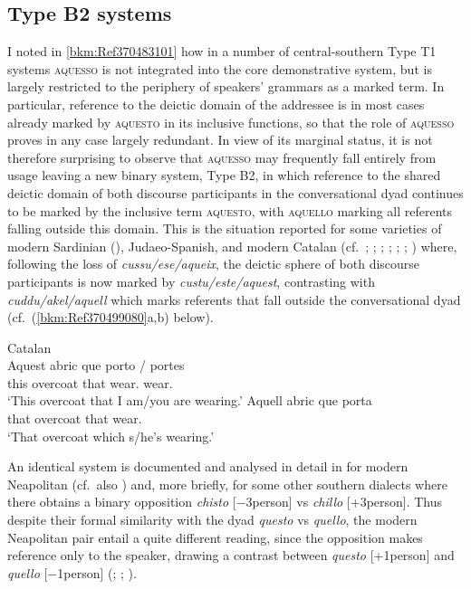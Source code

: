 \documentclass[output=paper]{langsci/langscibook}
\begin{document}
\subsection{Type B2 systems}\label{bkm:Ref370495450}

I noted in \cref{bkm:Ref370483101} how in a number of central-southern 
Type T1 systems \textsc{aques\-so} is not integrated into the core demonstrative
system, but is largely restricted to the periphery of speakers’ grammars as a
marked term. In particular, reference to the deictic domain of the addressee is
in most cases already marked by \textsc{aquesto} in its inclusive functions, so
that the role of \textsc{aquesso} proves in any case largely redundant. In view
of its marginal status, it is not therefore surprising to observe that
\textsc{aquesso} may frequently fall entirely from usage leaving a new binary
system, Type B2, in which reference to the shared deictic domain of both
discourse participants in the conversational dyad continues to be marked by the
inclusive term \textsc{aquesto}, with \textsc{aquello} marking all referents
falling outside this domain. This is the situation reported for some varieties
of modern Sardinian (\citealt[839]{Blasco-Ferrer:1988a}), Judaeo-Spanish, and
modern Catalan (cf.\ \citealt[281]{Badia-i-Margarit:1951a};
\citealt[501]{Badia-i-Margarit:1995a}; \citealt[81]{Duarte-i-Montserrat:1986a};
\citealt[120f]{Hualde:1992a}; \citealt[106]{Wheeler:1999a};
\citealt[§3.3]{Da-Milano:2007a};
\citealt[208f]{Nogue-Serrano:2015a}) where, following the loss of
\emph{cussu/ese/aqueix}, the deictic sphere of both discourse participants is
now marked by \emph{custu/este/aquest}, contrasting with
\emph{cuddu/akel/aquell} which marks referents that fall outside the
conversational dyad (cf.\ (\ref{bkm:Ref370499080}a,b) below).

\ea\label{bkm:Ref370499080}Catalan \citep{Wheeler:1999a}\\
    \ea
        \gll Aquest  abric  que  porto  /  portes\\
        this  overcoat  that  wear.\Fsg{} {} wear.\Ssg{}\\
        \glt \enquote*{This overcoat that I am/you are wearing.}
    \ex
    \gll Aquell  abric  que  porta\\
         that  overcoat  that  wear.\Tsg{}\\
    \glt \enquote*{That overcoat which s/he’s wearing.}
    \z
\z

An identical system is documented and analysed in detail in
\citet[96--104]{ledgeway2004sviluppo} for modern Neapolitan (cf.\ also
\citealt[195--212]{Ledgeway:2009a}) and, more briefly, for some other southern
dialects where there obtains a binary opposition \emph{chisto}
[−3person] vs \emph{chillo} [+3person]. Thus despite their formal
similarity with the  dyad \emph{questo} vs \emph{quello}, the modern
Neapolitan pair entail a quite different reading, since the  opposition
makes reference only to the speaker, drawing a contrast between \emph{questo}
[+1person] and \emph{quello} [−1person]
(\citealt[125]{Maiden:1995a}; \citealt[324]{Vanelli:1995a};
\citealt[82f]{Maiden:2000a}).
\end{document}
